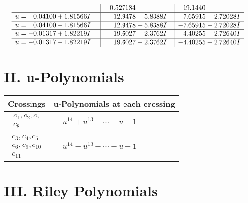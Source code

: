 \documentclass[1p]{elsarticle_modified}
\theoremstyle{definition}
\begin{document}
$$\begin{array}{c|c|c}
 & -0.527184\phantom{ +0.000000I} & -19.1440\phantom{ +0.000000I} \\ \hline\begin{aligned}
u &= \phantom{-}0.04100 + 1.81566 I\end{aligned}
 & \phantom{-}12.9478 - 5.8388 I & -7.65915 + 2.72028 I \\ \hline\begin{aligned}
u &= \phantom{-}0.04100 - 1.81566 I\end{aligned}
 & \phantom{-}12.9478 + 5.8388 I & -7.65915 - 2.72028 I \\ \hline\begin{aligned}
u &= -0.01317 + 1.82219 I\end{aligned}
 & \phantom{-}19.6027 + 2.3762 I & -4.40255 - 2.72640 I \\ \hline\begin{aligned}
u &= -0.01317 - 1.82219 I\end{aligned}
 & \phantom{-}19.6027 - 2.3762 I & -4.40255 + 2.72640 I\\
 \hline 
 \end{array}$$\newpage
\newpage\renewcommand{\arraystretch}{1}
\centering \section*{ II. u-Polynomials}
\begin{tabular}{m{50pt}|m{274pt}}
Crossings & \hspace{64pt}u-Polynomials at each crossing \\
\hline $$\begin{aligned}c_{1},c_{2},c_{7}\\c_{8}\end{aligned}$$&$\begin{aligned}
&u^{14}+u^{13}+\cdots- u-1
\end{aligned}$\\
\hline $$\begin{aligned}c_{3},c_{4},c_{5}\\c_{6},c_{9},c_{10}\\c_{11}\end{aligned}$$&$\begin{aligned}
&u^{14}- u^{13}+\cdots- u-1
\end{aligned}$\\
\hline
\end{tabular}\newpage\renewcommand{\arraystretch}{1}
\centering \section*{ III. Riley Polynomials}
\end{document}
